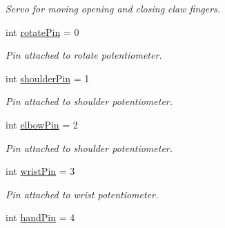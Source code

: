 \begin{DoxyCompactItemize}
\begin{DoxyCompactList}\small\item\em Servo for moving opening and closing claw fingers. \end{DoxyCompactList}\item 
\hypertarget{_full___robot___code_8ino_a6ddba77e62e5aee2488967a4562deb35}{int \hyperlink{_full___robot___code_8ino_a6ddba77e62e5aee2488967a4562deb35}{rotate\-Pin} = 0}\label{_full___robot___code_8ino_a6ddba77e62e5aee2488967a4562deb35}

\begin{DoxyCompactList}\small\item\em Pin attached to rotate potentiometer. \end{DoxyCompactList}\item 
\hypertarget{_full___robot___code_8ino_ab44cfb621485266d578560b812f86f7d}{int \hyperlink{_full___robot___code_8ino_ab44cfb621485266d578560b812f86f7d}{shoulder\-Pin} = 1}\label{_full___robot___code_8ino_ab44cfb621485266d578560b812f86f7d}

\begin{DoxyCompactList}\small\item\em Pin attached to shoulder potentiometer. \end{DoxyCompactList}\item 
\hypertarget{_full___robot___code_8ino_ab32d5ac361e31f1ab38fb6960c8956da}{int \hyperlink{_full___robot___code_8ino_ab32d5ac361e31f1ab38fb6960c8956da}{elbow\-Pin} = 2}\label{_full___robot___code_8ino_ab32d5ac361e31f1ab38fb6960c8956da}

\begin{DoxyCompactList}\small\item\em Pin attached to shoulder potentiometer. \end{DoxyCompactList}\item 
\hypertarget{_full___robot___code_8ino_a16a8a086661f7645d7dd150194819a54}{int \hyperlink{_full___robot___code_8ino_a16a8a086661f7645d7dd150194819a54}{wrist\-Pin} = 3}\label{_full___robot___code_8ino_a16a8a086661f7645d7dd150194819a54}

\begin{DoxyCompactList}\small\item\em Pin attached to wrist potentiometer. \end{DoxyCompactList}\item 
\hypertarget{_full___robot___code_8ino_a751e64316643e21766e99cf4329a7117}{int \hyperlink{_full___robot___code_8ino_a751e64316643e21766e99cf4329a7117}{hand\-Pin} = 4}\label{_full___robot___code_8ino_a751e64316643e21766e99cf4329a7117}


\end{DoxyCompactItemize}
